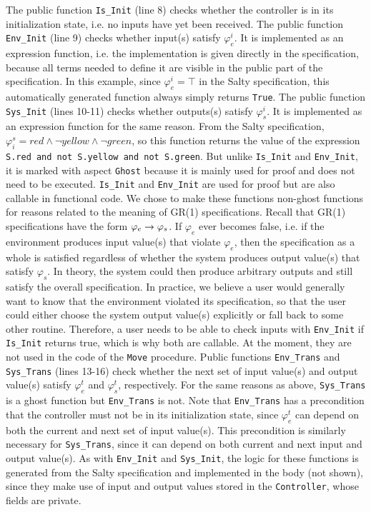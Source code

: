 \documentclass[runningheads]{llncs}
\begin{document}
The public function \lstinline{Is_Init} (line 8) checks whether the controller is in its initialization state, i.e. no inputs have yet been received. 
The public function \lstinline{Env_Init} (line 9) checks whether input(s) satisfy $\varphi_e^i$. 
It is implemented as an expression function, i.e. the implementation is given directly in the specification, 
because all terms needed to define it are visible in the public part of the specification. 
In this example, since $\varphi_e^i = \top$ in the Salty specification, this automatically generated function always simply returns \lstinline{True}. 
The public function \lstinline{Sys_Init} (lines 10-11) checks whether outputs(s) satisfy $\varphi_s^i$. 
It is implemented as an expression function for the same reason.  
From the Salty specification, $\varphi^s_i = red \land \lnot yellow \land \lnot green$, so this function returns the value of
the expression \lstinline{S.red and not S.yellow and not S.green}.
But unlike \lstinline{Is_Init} and \lstinline{Env_Init}, it is marked with aspect \lstinline{Ghost} because it is mainly used for proof and does not need to be executed. 
\lstinline{Is_Init} and \lstinline{Env_Init} are used for proof but are also callable in functional code. 
We chose to make these functions non-ghost functions for reasons related to the meaning of GR(1) specifications. 
Recall that GR(1) specifications have the form $\varphi_e \rightarrow \varphi_s$. 
If $\varphi_e$ ever becomes false, i.e. if the environment produces input value(s) that violate $\varphi_e$, then the specification as a whole 
is satisfied regardless of whether the system produces output value(s) that satisfy $\varphi_s$. 
In theory, the system could then produce arbitrary outputs and still satisfy the overall specification. 
In practice, we believe a user would generally want to know that the environment violated its specification, 
so that the user could either choose the system output value(s) explicitly or fall back to some other routine. 
Therefore, a user needs to be able to check inputs with \lstinline{Env_Init} if \lstinline{Is_Init} returns true, 
which is why both are callable. At the moment, they are not used in the code of the \lstinline{Move} procedure.
Public functions \lstinline{Env_Trans} and \lstinline{Sys_Trans} (lines 13-16) check whether the next set of input value(s) and output value(s) 
satisfy $\varphi_e^t$ and $\varphi_s^t$, respectively. 
For the same reasons as above, \lstinline{Sys_Trans} is a ghost function but \lstinline{Env_Trans} is not.
Note that \lstinline{Env_Trans} has a precondition that the controller must not be in its initialization state, 
since $\varphi_e^t$ can depend on both the current and next set of input value(s). 
This precondition is similarly necessary for \lstinline{Sys_Trans}, since it can depend on both current and next input and output value(s). 
As with \lstinline{Env_Init} and \lstinline{Sys_Init}, the logic for these functions is generated from the Salty specification and 
implemented in the body (not shown), since they make use of input and output values stored in the \lstinline{Controller}, whose fields are private.
\end{document}
